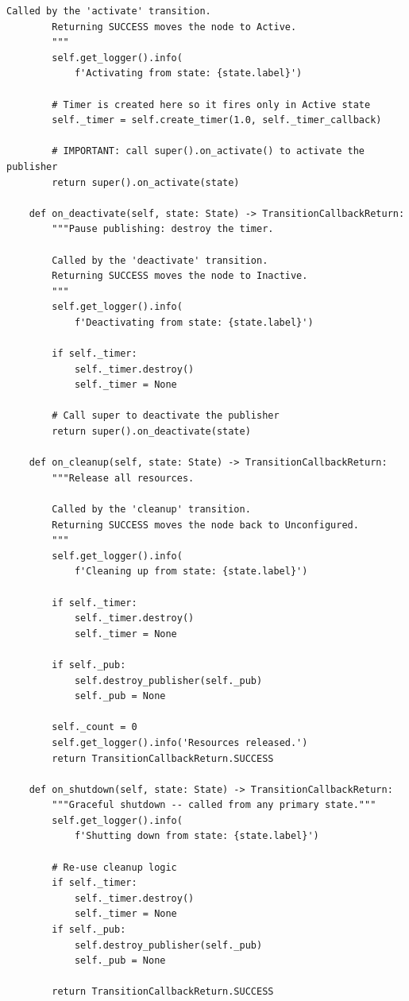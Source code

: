 \documentclass[12pt,a4paper]{article}
\begin{document}
\begin{lstlisting}[style=python,caption={lifecycle\_talker.py -- full example}]
        Called by the 'activate' transition.
        Returning SUCCESS moves the node to Active.
        """
        self.get_logger().info(
            f'Activating from state: {state.label}')

        # Timer is created here so it fires only in Active state
        self._timer = self.create_timer(1.0, self._timer_callback)

        # IMPORTANT: call super().on_activate() to activate the publisher
        return super().on_activate(state)

    def on_deactivate(self, state: State) -> TransitionCallbackReturn:
        """Pause publishing: destroy the timer.

        Called by the 'deactivate' transition.
        Returning SUCCESS moves the node to Inactive.
        """
        self.get_logger().info(
            f'Deactivating from state: {state.label}')

        if self._timer:
            self._timer.destroy()
            self._timer = None

        # Call super to deactivate the publisher
        return super().on_deactivate(state)

    def on_cleanup(self, state: State) -> TransitionCallbackReturn:
        """Release all resources.

        Called by the 'cleanup' transition.
        Returning SUCCESS moves the node back to Unconfigured.
        """
        self.get_logger().info(
            f'Cleaning up from state: {state.label}')

        if self._timer:
            self._timer.destroy()
            self._timer = None

        if self._pub:
            self.destroy_publisher(self._pub)
            self._pub = None

        self._count = 0
        self.get_logger().info('Resources released.')
        return TransitionCallbackReturn.SUCCESS

    def on_shutdown(self, state: State) -> TransitionCallbackReturn:
        """Graceful shutdown -- called from any primary state."""
        self.get_logger().info(
            f'Shutting down from state: {state.label}')

        # Re-use cleanup logic
        if self._timer:
            self._timer.destroy()
            self._timer = None
        if self._pub:
            self.destroy_publisher(self._pub)
            self._pub = None

        return TransitionCallbackReturn.SUCCESS


\end{lstlisting}
\end{document}
